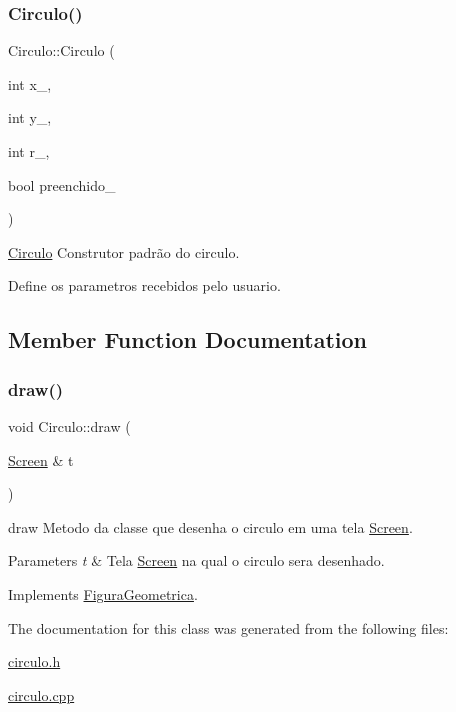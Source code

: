 \subsubsection{\texorpdfstring{Circulo()}{Circulo()}}
{\footnotesize\ttfamily Circulo\+::\+Circulo (\begin{DoxyParamCaption}\item[{int}]{x\+\_\+,  }\item[{int}]{y\+\_\+,  }\item[{int}]{r\+\_\+,  }\item[{bool}]{preenchido\+\_\+ }\end{DoxyParamCaption})}



\hyperlink{class_circulo}{Circulo} Construtor padrão do circulo. 

Define os parametros recebidos pelo usuario. 

\subsection{Member Function Documentation}
\mbox{\label{class_circulo_a593787d6e0618c2eded23e8839e7bea6}} 
\subsubsection{\texorpdfstring{draw()}{draw()}}
{\footnotesize\ttfamily void Circulo\+::draw (\begin{DoxyParamCaption}\item[{\hyperlink{class_screen}{Screen} \&}]{t }\end{DoxyParamCaption})\hspace{0.3cm}{\ttfamily [virtual]}}



draw Metodo da classe que desenha o circulo em uma tela \hyperlink{class_screen}{Screen}. 


\begin{DoxyParams}{Parameters}
{\em t} & Tela \hyperlink{class_screen}{Screen} na qual o circulo sera desenhado. \\
\hline
\end{DoxyParams}


Implements \hyperlink{class_figura_geometrica_a8ee8dedc060b6059a805ea091aef2c41}{Figura\+Geometrica}.



The documentation for this class was generated from the following files\+:\begin{DoxyCompactItemize}
\item 
\hyperlink{circulo_8h}{circulo.\+h}\item 
\hyperlink{circulo_8cpp}{circulo.\+cpp}\end{DoxyCompactItemize}
